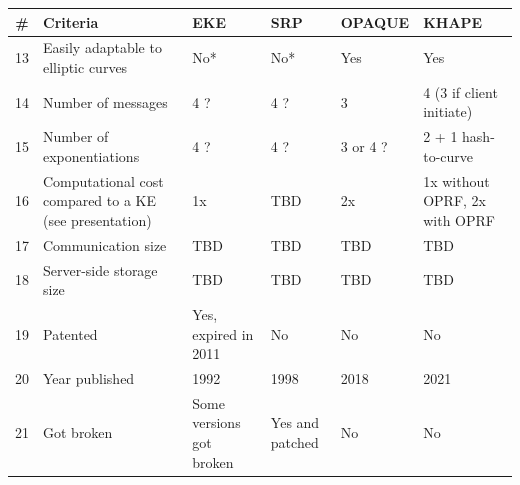 ﻿\documentclass[../report.tex]{subfiles}
\begin{document}
\begin{center}
   \begin{tabular}{ | c | p{5cm} || p{2cm} | p{2cm} | p{2cm} | p{2cm} | }
     \hline
     \textbf{\#} & \textbf{Criteria} & \textbf{EKE} & \textbf{SRP} & \textbf{OPAQUE} & \textbf{KHAPE} \\ \hline
     
     13 & Easily adaptable to elliptic curves & No* & No* & Yes & Yes \\ \hline
     14 & Number of messages & 4 ? & 4 ? & 3 & 4 (3 if client initiate) \\ \hline
     15 & Number of exponentiations & 4 ? & 4 ? & 3 or 4 ? & 2 + 1 hash-to-curve \\ \hline
     16 & Computational cost compared to a KE (see \cite{KHAPE_Paper} presentation) & 1x & TBD & 2x & 1x without OPRF, 2x with OPRF \\ \hline
     17 & Communication size & TBD & TBD & TBD & TBD \\ \hline
     18 & Server-side storage size & TBD & TBD & TBD & TBD \\ \hline
     
     19 & Patented & Yes, expired in 2011 & No & No & No \\ \hline
     20 & Year published & 1992 & 1998 & 2018 & 2021 \\ \hline
     21 & Got broken & Some versions got broken & Yes and patched \cite{CAA} & No & No \\ \hline
     \end{tabular}
 \end{center}
\end{document}
